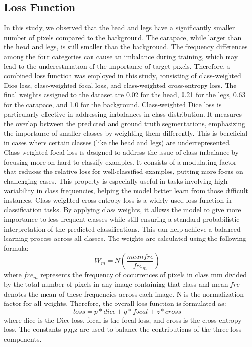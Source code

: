 \documentclass[conference]{IEEEtran}
\begin{document}
\subsection{Loss Function}
In this study, we observed that the head and legs have a significantly smaller number of pixels compared to the background. The carapace, while larger than the head and legs, is still smaller than the background. The frequency differences among the four categories can cause an imbalance during training, which may lead to the underestimation of the importance of target pixels. Therefore, a combined loss function was employed in this study, consisting of class-weighted Dice loss, class-weighted focal loss, and class-weighted cross-entropy loss. The final weights assigned to the dataset are 0.02 for the head, 0.21 for the legs, 0.63 for the carapace, and 1.0 for the background.
Class-weighted Dice loss is particularly effective in addressing imbalances in class distribution. It measures the overlap between the predicted and ground truth segmentations, emphasizing the importance of smaller classes by weighting them differently. This is beneficial in cases where certain classes (like the head and legs) are underrepresented.
Class-weighted focal loss is designed to address the issue of class imbalance by focusing more on hard-to-classify examples. It consists of a modulating factor that reduces the relative loss for well-classified examples, putting more focus on challenging cases. This property is especially useful in tasks involving high variability in class frequencies, helping the model better learn from those difficult instances.
Class-weighted cross-entropy loss is a widely used loss function in classification tasks. By applying class weights, it allows the model to give more importance to less frequent classes while still ensuring a standard probabilistic interpretation of the predicted classifications. This can help achieve a balanced learning process across all classes.
The weights are calculated using the following formula:
$$
W_m=N(\frac{mean fre}{fre_m })
$$
where $fre_m$ represents the frequency of occurrences of pixels in class mm divided by the total number of pixels in any image containing that class and mean $fre$  denotes the mean of these frequencies across each image. N is the normalization factor for all weights. Therefore, the overall loss function is formulated as:
$$
loss=p*dice+q*focal+z*cross
$$
where dice is the Dice loss, focal is the focal loss, and cross is the cross-entropy loss. The constants p,q,z are used to balance the contributions of the three loss components.
\end{document}
